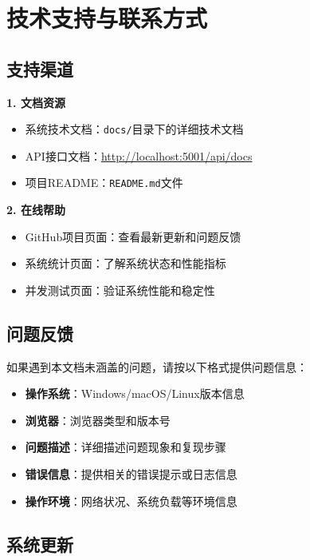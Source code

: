 \documentclass[12pt, a4paper]{article}
\begin{document}
\section{技术支持与联系方式}

\subsection{支持渠道}

\begin{infobox}[title={获取技术支持}]
\textbf{1. 文档资源}
\begin{itemize}[nosep]
    \item 系统技术文档：\texttt{docs/}目录下的详细技术文档
    \item API接口文档：\url{http://localhost:5001/api/docs}
    \item 项目README：\texttt{README.md}文件
\end{itemize}

\textbf{2. 在线帮助}
\begin{itemize}[nosep]
    \item GitHub项目页面：查看最新更新和问题反馈
    \item 系统统计页面：了解系统状态和性能指标
    \item 并发测试页面：验证系统性能和稳定性
\end{itemize}
\end{infobox}

\subsection{问题反馈}

如果遇到本文档未涵盖的问题，请按以下格式提供问题信息：

\begin{itemize}
    \item \textbf{操作系统}：Windows/macOS/Linux版本信息
    \item \textbf{浏览器}：浏览器类型和版本号
    \item \textbf{问题描述}：详细描述问题现象和复现步骤
    \item \textbf{错误信息}：提供相关的错误提示或日志信息
    \item \textbf{操作环境}：网络状况、系统负载等环境信息
\end{itemize}

\subsection{系统更新}
\end{document}
